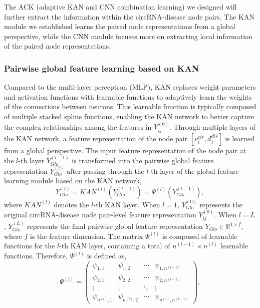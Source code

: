 \documentclass[journal=jcisd8,manuscript=article]{achemso}
\begin{document}
The ACK (adaptive KAN and CNN combination learning) we designed will further extract the information within the circRNA-disease node pairs. The KAN module we established learns the paired node representations from a global perspective, while the CNN module focuses more on extracting local information of the paired node representations.
\vspace{-0.5cm}

\subsubsection{Pairwise global feature learning based on KAN}
\vspace{-0.3cm}
Compared to the multi-layer perceptron (MLP), KAN replaces weight parameters and activation functions with learnable functions to adaptively learn the weights of the connections between neurons. This learnable function is typically composed of multiple stacked spline functions, enabling the KAN network to better capture the complex relationships among the features in ${Y_{ij}^{(0)}}$. Through multiple layers of the KAN network, a feature representation of the node pair $[v_i^{cir}, d_j^{dis}]$ is learned from a global perspective. The input feature representation of the node pair at the $l$-th layer $Y_{Glo}^{(l - 1)}$ is transformed into the pairwise global feature representation ${Y}_{Glo}^{(l)}$ after passing through the $l$-th layer of the global feature learning module based on the KAN network,
\begin{equation}
    {Y}_{Glo}^{(l)} = KAN^{(l)}(Y_{Glo}^{(l - 1)}) = \varPsi^{(l)}(Y_{Glo}^{(l - 1)}),
\end{equation}
where $KAN^{(l)}$ denotes the $l$-th KAN layer. When $l=1$, $Y_{Glo}^{(0)}$ represents the original circRNA-disease node pair-level feature representation $Y_{ij}^{(0)}$. When $l=L$, $Y_{Glo}^{(L)}$ represents the final pairwise global feature representation ${Y}_{Glo} \in \mathbb{R}^{1\times f}$, where $f$ is the feature dimension. The matrix $\varPsi^{(l)}$ is composed of learnable functions for the $l$-th KAN layer, containing a total of $n^{(l - 1)} \times n^{(l)}$ learnable functions. Therefore, $\varPsi^{(l)}$ is defined as,
\begin{equation}
    \varPsi^{(l)} = \left(
    \begin{array}{cccc}
        \psi_{1,1} & \psi_{1,2} & \cdots & \psi_{1,n^{(l-1)}} \\
        \psi_{2,1} & \psi_{2,2} & \cdots & \psi_{2,n^{(l-1)}} \\
        \vdots & \vdots & \ddots & \vdots \\
        \psi_{n^{(l)},1} & \psi_{n^{(l)},2} & \cdots & \psi_{n^{(l)},n^{(l-1)}}
    \end{array}
    \right),
\end{equation}
\end{document}
